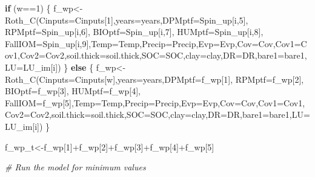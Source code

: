 \documentclass[
  10pt,
  b5paper,
]{book}
\newenvironment{Shaded}{\begin{snugshade}}{\end{snugshade}}
\newcommand{\AttributeTok}[1]{\textcolor[rgb]{0.77,0.63,0.00}{#1}}
\newcommand{\CommentTok}[1]{\textcolor[rgb]{0.56,0.35,0.01}{\textit{#1}}}
\newcommand{\ControlFlowTok}[1]{\textcolor[rgb]{0.13,0.29,0.53}{\textbf{#1}}}
\newcommand{\DecValTok}[1]{\textcolor[rgb]{0.00,0.00,0.81}{#1}}
\newcommand{\FunctionTok}[1]{\textcolor[rgb]{0.00,0.00,0.00}{#1}}
\newcommand{\NormalTok}[1]{#1}
\newcommand{\OtherTok}[1]{\textcolor[rgb]{0.56,0.35,0.01}{#1}}
\newcommand{\SpecialCharTok}[1]{\textcolor[rgb]{0.00,0.00,0.00}{#1}}
\begin{document}
\begin{Shaded}
\begin{Highlighting}[]
\ControlFlowTok{if}\NormalTok{ (w}\SpecialCharTok{==}\DecValTok{1}\NormalTok{) \{}
\NormalTok{f\_wp}\OtherTok{\textless{}{-}}\FunctionTok{Roth\_C}\NormalTok{(}\AttributeTok{Cinputs=}\NormalTok{Cinputs[}\DecValTok{1}\NormalTok{],}\AttributeTok{years=}\NormalTok{years,}\AttributeTok{DPMptf=}\NormalTok{Spin\_up[i,}\DecValTok{5}\NormalTok{], }\AttributeTok{RPMptf=}\NormalTok{Spin\_up[i,}\DecValTok{6}\NormalTok{], }\AttributeTok{BIOptf=}\NormalTok{Spin\_up[i,}\DecValTok{7}\NormalTok{], }\AttributeTok{HUMptf=}\NormalTok{Spin\_up[i,}\DecValTok{8}\NormalTok{], }\AttributeTok{FallIOM=}\NormalTok{Spin\_up[i,}\DecValTok{9}\NormalTok{],}\AttributeTok{Temp=}\NormalTok{Temp,}\AttributeTok{Precip=}\NormalTok{Precip,}\AttributeTok{Evp=}\NormalTok{Evp,}\AttributeTok{Cov=}\NormalTok{Cov,}\AttributeTok{Cov1=}\NormalTok{Cov1,}\AttributeTok{Cov2=}\NormalTok{Cov2,}\AttributeTok{soil.thick=}\NormalTok{soil.thick,}\AttributeTok{SOC=}\NormalTok{SOC,}\AttributeTok{clay=}\NormalTok{clay,}\AttributeTok{DR=}\NormalTok{DR,}\AttributeTok{bare1=}\NormalTok{bare1,}\AttributeTok{LU=}\NormalTok{LU\_im[i])}
\NormalTok{\} }\ControlFlowTok{else}\NormalTok{ \{}
\NormalTok{f\_wp}\OtherTok{\textless{}{-}}\FunctionTok{Roth\_C}\NormalTok{(}\AttributeTok{Cinputs=}\NormalTok{Cinputs[w],}\AttributeTok{years=}\NormalTok{years,}\AttributeTok{DPMptf=}\NormalTok{f\_wp[}\DecValTok{1}\NormalTok{], }\AttributeTok{RPMptf=}\NormalTok{f\_wp[}\DecValTok{2}\NormalTok{], }\AttributeTok{BIOptf=}\NormalTok{f\_wp[}\DecValTok{3}\NormalTok{], }\AttributeTok{HUMptf=}\NormalTok{f\_wp[}\DecValTok{4}\NormalTok{], }\AttributeTok{FallIOM=}\NormalTok{f\_wp[}\DecValTok{5}\NormalTok{],}\AttributeTok{Temp=}\NormalTok{Temp,}\AttributeTok{Precip=}\NormalTok{Precip,}\AttributeTok{Evp=}\NormalTok{Evp,}\AttributeTok{Cov=}\NormalTok{Cov,}\AttributeTok{Cov1=}\NormalTok{Cov1,}\AttributeTok{Cov2=}\NormalTok{Cov2,}\AttributeTok{soil.thick=}\NormalTok{soil.thick,}\AttributeTok{SOC=}\NormalTok{SOC,}\AttributeTok{clay=}\NormalTok{clay,}\AttributeTok{DR=}\NormalTok{DR,}\AttributeTok{bare1=}\NormalTok{bare1,}\AttributeTok{LU=}\NormalTok{LU\_im[i])}
\NormalTok{\}}

\NormalTok{f\_wp\_t}\OtherTok{\textless{}{-}}\NormalTok{f\_wp[}\DecValTok{1}\NormalTok{]}\SpecialCharTok{+}\NormalTok{f\_wp[}\DecValTok{2}\NormalTok{]}\SpecialCharTok{+}\NormalTok{f\_wp[}\DecValTok{3}\NormalTok{]}\SpecialCharTok{+}\NormalTok{f\_wp[}\DecValTok{4}\NormalTok{]}\SpecialCharTok{+}\NormalTok{f\_wp[}\DecValTok{5}\NormalTok{]}

\CommentTok{\# Run the model for minimum values}


\end{Highlighting}
\end{Shaded}
\end{document}
